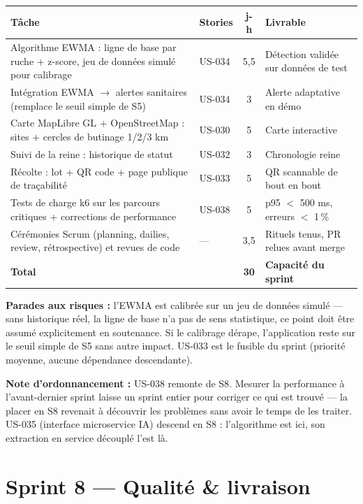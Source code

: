 \begin{center}
\small
\begin{tabular}{p{7.2cm}lcp{4.6cm}}
\toprule
\textbf{Tâche} & \textbf{Stories} & \textbf{j-h} & \textbf{Livrable} \\
\midrule
Algorithme EWMA : ligne de base par ruche + z-score, jeu de données
simulé pour calibrage & US-034 & 5,5 & Détection validée sur données de test \\
Intégration EWMA $\rightarrow$ alertes sanitaires (remplace le seuil
simple de S5) & US-034 & 3 & Alerte adaptative en démo \\
Carte MapLibre GL + OpenStreetMap : sites + cercles de butinage 1/2/3 km & US-030 & 5 & Carte interactive \\
Suivi de la reine : historique de statut & US-032 & 3 & Chronologie reine \\
Récolte : lot + QR code + page publique de traçabilité & US-033 & 5 & QR scannable de bout en bout \\
Tests de charge k6 sur les parcours critiques + corrections
de performance & US-038 & 5 & p95 $<$ 500 ms, erreurs $<$ 1\,\% \\
\addlinespace
Cérémonies Scrum (planning, dailies, review, rétrospective) et
revues de code & --- & 3,5 & Rituels tenus, PR relues avant merge \\
\midrule
\textbf{Total} & & \textbf{30} & \textbf{Capacité du sprint} \\
\bottomrule
\end{tabular}
\end{center}

\textbf{Parades aux risques :} l'EWMA est calibrée sur un jeu de données
simulé --- sans historique réel, la ligne de base n'a pas de sens
statistique, ce point doit être assumé explicitement en soutenance. Si le
calibrage dérape, l'application reste sur le seuil simple de S5 sans autre
impact. US-033 est le fusible du sprint (priorité moyenne, aucune
dépendance descendante).

\textbf{Note d'ordonnancement :} US-038 remonte de S8. Mesurer la
performance à l'avant-dernier sprint laisse un sprint entier pour corriger
ce qui est trouvé --- la placer en S8 revenait à découvrir les problèmes
sans avoir le temps de les traiter. US-035 (interface microservice IA)
descend en S8 : l'algorithme est ici, son extraction en service découplé
l'est là.

\section{Sprint 8 --- Qualité \& livraison}

